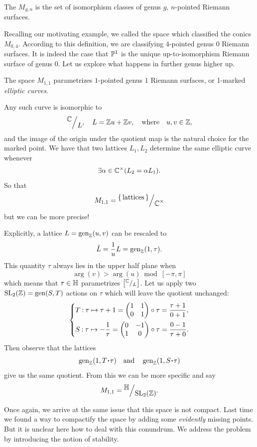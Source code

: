 \documentclass[12pt]{memoir}
\begin{document}
\begin{Def}
    The  $M_{g,n}$ is the set of isomorphism classes of genus $g$, $n$-pointed Riemann surfaces.
\end{Def}

Recalling our motivating example, we called the space which classified the conics $M_{0,4}$. According to this definition, we are classifying $4$-pointed genus 0 Riemann surfaces. It is indeed the case that $\mathbb{P}^1$ is the unique up-to-isomorphism Riemann surface of genus 0. Let us explore what happens in further genus higher up.

\begin{Ex}
    The space $M_{1,1}$ parametrizes $1$-pointed genus $1$ Riemann surfaces, or 1-marked \emph{elliptic curves}.\par
    Any such curve is isomorphic to 
    $$\quot{\bC}{L},\quad L=\bZ u+\bZ v,\word{where}u,v\in\bZ,$$
    and the image of the origin under the quotient map is the natural choice for the marked point. We have that two lattices $L_1,L_2$ determine the same elliptic curve whenever 
    $$\exists \alpha\in\mathbb{C}^\times(L_2=\alpha L_1).$$
    So that 
    $$M_{1,1}=\quot{\set{\text{lattices}}}{\bC^\x}$$
    but we can be more precise!\par
    Explicitly, a lattice $L=\operatorname{gen}_{\mathbb{Z}}(u,v)$ can be rescaled to
    $$\tilde{L}=\frac{1}{u}L=\operatorname{gen}_{\mathbb{Z}}(1,\tau).$$
    This quantity $\tau$ always lies in the upper half plane when 
    $$\arg(v)>\arg(u)\bmod[-\pi,\pi]$$
    which means that $\tau\in\mathbb{H}$ parametrizes $\bonj{\quot{\bC}{L}}$. 
    Let us apply two $\mathrm{SL}_2(\mathbb{Z})=\operatorname{gen}(S,T)$ actions on $\tau$ which will leave the quotient unchanged:
    $$
    \left\lbrace
    \begin{aligned}
        &T\mathbin{:}\tau\mapsto\tau+1=\begin{pmatrix} 1 & 1 \\ 0 & 1 \end{pmatrix}\circ\tau=\frac{\tau+1}{0+1},\\
        &S\mathbin{:}\tau\mapsto-\frac1\tau=\begin{pmatrix} 0 & -1 \\ 1 & 0 \end{pmatrix}\circ\tau=\frac{0-1}{\tau+0}.
    \end{aligned}
    \right.
    $$
    Then observe that the lattices
    $$\gen_\bZ(1,T\.\tau)\word{and}\gen_\bZ(1,S\.\tau)$$
    give us the same quotient. From this we can be more specific and say
    $$M_{1,1}=\quot{\bH}{\rSL_2(\bZ)}.$$
\end{Ex}

Once again, we arrive at the same issue that this space is not compact. Last time we found a way to compactify the space by adding some \emph{evidently} missing points. But it is unclear here how to deal with this conundrum. We address the problem by introducing the notion of stability.
\end{document}
